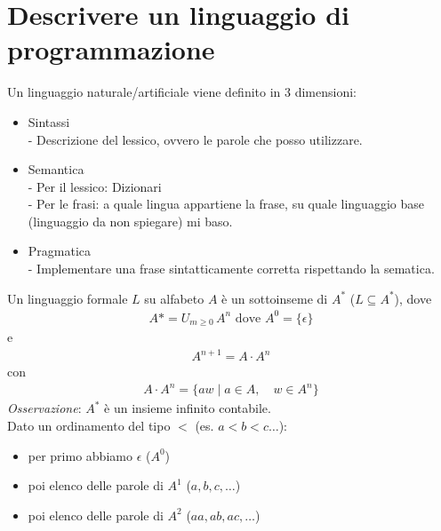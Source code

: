 \documentclass[a4paper,12pt]{article}
\begin{document}
\section{Descrivere un linguaggio di programmazione}
Un linguaggio naturale/artificiale viene definito in 3 dimensioni:
\begin{itemize}
  \item Sintassi \\
  - Descrizione del lessico, ovvero le parole che posso utilizzare.
  \item Semantica \\
  - Per il lessico: Dizionari \\
  - Per le frasi: a quale lingua appartiene la frase, su quale linguaggio base (linguaggio da non spiegare) mi baso.
  \item Pragmatica \\
  - Implementare una frase sintatticamente corretta rispettando la sematica.
\end{itemize} 
Un linguaggio formale $L$ su alfabeto $A$ è un sottoinseme di $A^*$ ($L \subseteq A^*$), dove
\begin{align*}
  A* = U_{m \geq 0} \, A^n \text{ dove } A^0=\{\epsilon\}
\end{align*}
e 
\begin{align*}
  A^{n+1} = A \cdot A^n
\end{align*}
con 
\begin{align*}
  A \cdot A^n = \{aw \mid a \in A, \quad w \in A^n\}
\end{align*}
\textit{Osservazione}: $A^*$ è un insieme infinito contabile. 
\vspace{1em} \\
Dato un ordinamento del tipo $<$ (es. $a<b<c\dots$):
\begin{itemize}
  \item per primo abbiamo $\epsilon$ ($A^0$)
  \item poi elenco delle parole di $A^1$ ($a,b,c,\dots$)
  \item poi elenco delle parole di $A^2$ ($aa,ab,ac,\dots$)
\end{itemize}
\end{document}
